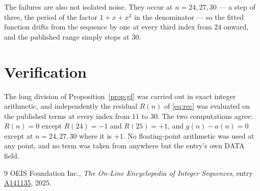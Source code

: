 \documentclass[11pt,a4paper]{article}
\theoremstyle{plain}
\theoremstyle{definition}
\begin{document}
The failures are also not isolated noise. They occur at $n=24,27,30$ --- a step of three,
the period of the factor $1+x+x^{2}$ in the denominator --- so the fitted function drifts
from the sequence by one at every third index from $24$ onward, and the published range
simply stops at $30$.

\section{Verification}

The long division of Proposition~\ref{prop:gf} was carried out in exact integer arithmetic,
and independently the residual $R(n)$ of \eqref{eq:rec} was evaluated on the published terms
at every index from $11$ to $30$. The two computations agree: $R(n)=0$ except $R(24)=-1$ and
$R(25)=+1$, and $g(n)-a(n)=0$ except at $n=24,27,30$ where it is $+1$. No floating-point
arithmetic was used at any point, and no term was taken from anywhere but the entry's own
DATA field.

\begin{thebibliography}{9}
 OEIS Foundation Inc., \emph{The On-Line Encyclopedia of Integer Sequences},
entry \href{https://oeis.org/A141135}{A141135}, 2025.
\end{thebibliography}
\end{document}
